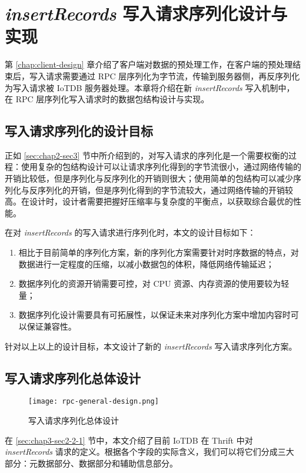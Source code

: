 
\chapter{\emph{insertRecords} 写入请求序列化设计与实现\label{sec:chap6}}
第 \ref{chap:client-design} 章介绍了客户端对数据的预处理工作，在客户端的预处理结束后，写入请求需要通过 RPC 层序列化为字节流，传输到服务器侧，再反序列化为写入请求被 IoTDB 服务器处理。本章将介绍在新 \emph{insertRecords} 写入机制中，在 RPC 层序列化写入请求时的数据包结构设计与实现。

\section{写入请求序列化的设计目标}
正如 \ref{sec:chap2-sec3} 节中所介绍到的，对写入请求的序列化是一个需要权衡的过程：使用复杂的包结构设计可以让请求序列化得到的字节流很小，通过网络传输的开销比较低，但是序列化与反序列化的开销则很大；使用简单的包结构可以减少序列化与反序列化的开销，但是序列化得到的字节流较大，通过网络传输的开销较高。在设计时，设计者需要把握好压缩率与复杂度的平衡点，以获取综合最优的性能。

在对 \emph{insertRecords} 的写入请求进行序列化时，本文的设计目标如下：
\begin{enumerate}
  \item 相比于目前简单的序列化方案，新的序列化方案需要针对时序数据的特点，对数据进行一定程度的压缩，以减小数据包的体积，降低网络传输延迟；
  \item 数据序列化的资源开销需要可控，对 CPU 资源、内存资源的使用要较为轻量；
  \item 数据序列化设计需要具有可拓展性，以保证未来对序列化方案中增加内容时可以保证兼容性。
\end{enumerate}
针对以上以上的设计目标，本文设计了新的 \emph{insertRecords} 写入请求序列化方案。

\section{写入请求序列化总体设计}
\begin{figure}
  \centering
  \texttt{[image: rpc-general-design.png]}
  \caption{写入请求序列化总体设计}
  \label{fig:rpc-general-design}
\end{figure}

在 \ref{sec:chap3-sec2-2-1} 节中，本文介绍了目前 IoTDB 在 Thrift 中对 \emph{insertRecords} 请求的定义。根据各个字段的实际含义，我们可以将它们分成三大部分：元数据部分、数据部分和辅助信息部分。

